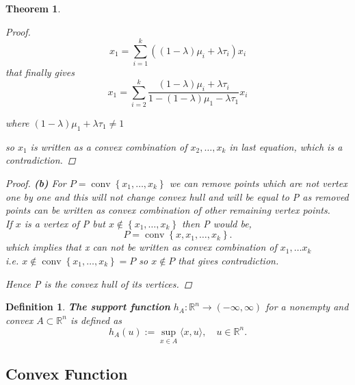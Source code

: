 \documentclass[oneside]{book}
\newtheorem{theorem}{Theorem}[section]
\newtheorem{mydef}{Definition}[section]
\begin{document}
\begin{theorem}
\begin{proof}
			\begin{equation} 
			\label{eq38}
			x_{1}=\sum_{i=1}^{k}\left((1-\lambda) \mu_{i}+\lambda \tau_{i}\right) x_{i}
			\end{equation}
			that finally gives 
			\begin{equation} 
			\label{eq39}
			x_{1}=\sum_{i=2}^{k} \frac{(1-\lambda) \mu_{i}+\lambda \tau_{i}}{1-(1-\lambda) \mu_{1}-\lambda \tau_{1}} x_{i}
			\end{equation}
			
			where $(1-\lambda) \mu_{1}+\lambda \tau_{1} \neq 1$ \par
			so $x_{1}$ is written as a convex combination of $x_{2}, \ldots, x_{k}$ in last equation, which is  a contradiction.
		\end{proof}
		
		\begin{proof}    \textbf{(b)}  For $P=\operatorname{conv}\left\{x_{1}, \ldots, x_{k}\right\}$ we can remove points  which are not vertex  
			one by one and this will not change convex hull and will be equal to P as removed points can be written as convex combination of other remaining vertex points. \\
			If $x$ is a vertex of P but $x \notin \left\{x_{1}, \ldots, x_{k}\right\} $ then P would be,
			$$P=\operatorname{conv}\left\{x,x_{1}, \ldots, x_{k}\right\}.$$ 
			which implies that x can not be written as convex combination of $x_{1}, \ldots x_{k}$ \\ i.e. 
			$x \notin  \operatorname{conv} \left\{x_{1}, \ldots, x_{k}\right\} = P  $ so $x \notin P$ that gives contradiction.\par
			Hence P is the convex hull of its vertices.
		\end{proof}
		
		
	\end{theorem}
	
	
	\begin{mydef}\label{d:8}
		\textbf{The support function }$h_{A}: \mathbb{R}^{n} \rightarrow(-\infty, \infty) $  for a nonempty and convex $A \subset \mathbb{R}^{n}$ is defined as
		$$
		h_{A}(u):=\sup _{x \in A}\langle x, u\rangle, \quad u \in \mathbb{R}^{n}.
		$$
		
	\end{mydef}
	
	
	
	\subsection{Convex Function}
	\label{ss:17}
	
\end{document}
